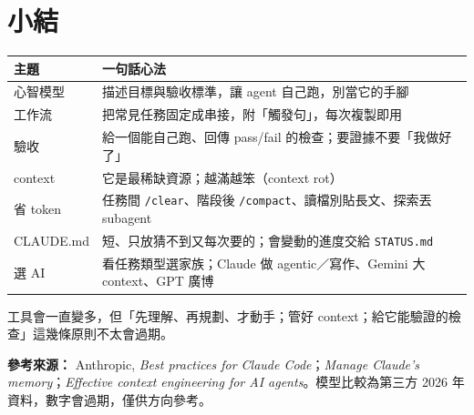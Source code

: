 \documentclass[12pt, a4paper]{article}
\begin{document}
\section{小結}

\begin{table}[h]
\centering
\begin{tabularx}{\linewidth}{lY}
\toprule
主題 & 一句話心法 \\
\midrule
心智模型 & 描述目標與驗收標準，讓 agent 自己跑，別當它的手腳 \\
工作流 & 把常見任務固定成串接，附「觸發句」，每次複製即用 \\
驗收 & 給一個能自己跑、回傳 pass/fail 的檢查；要證據不要「我做好了」 \\
context & 它是最稀缺資源；越滿越笨（context rot） \\
省 token & 任務間 \texttt{/clear}、階段後 \texttt{/compact}、讀檔別貼長文、探索丟 subagent \\
CLAUDE.md & 短、只放猜不到又每次要的；會變動的進度交給 \texttt{STATUS.md} \\
選 AI & 看任務類型選家族；Claude 做 agentic／寫作、Gemini 大 context、GPT 廣博 \\
\bottomrule
\end{tabularx}
\end{table}

工具會一直變多，但「先理解、再規劃、才動手；管好 context；給它能驗證的檢查」這幾條原則不太會過期。

\vspace{1em}
\noindent\textbf{參考來源：} Anthropic, \emph{Best practices for Claude Code}；\emph{Manage Claude's memory}；\emph{Effective context engineering for AI agents}。模型比較為第三方 2026 年資料，數字會過期，僅供方向參考。
\end{document}
